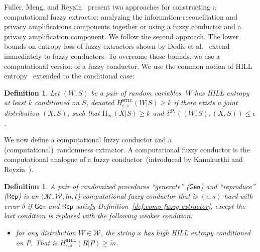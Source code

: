 \documentclass[11pt]{article}
\newcommand{\apref}[1]{\mbox{Appendix~\ref{#1}}}
\newcommand{\defref}[1]{\mbox{Definition~\ref{#1}}}
\newcommand{\class}[1]{{\ensuremath{\mathsf{#1}}}}
\newcommand{\gen}{\ensuremath{\class{Gen}}\xspace}
\newcommand{\rep}{\ensuremath{\class{Rep}}\xspace}
\newcommand{\hill}{\ensuremath{\mathtt{HILL}}\xspace}
\newcommand{\Hav}{\tilde{\mathrm{H}}_\infty}
\newtheorem{definition}[theorem]{Definition}
\begin{document}
Fuller, Meng, and Reyzin~\cite{fuller2013computational} present two approaches for constructing a computational fuzzy extractor: analyzing the information-reconciliation and privacy amplifications components together or using a fuzzy conductor and a privacy amplification component.  We follow the second approach.
The lower bounds on entropy loss of fuzzy extractors shown by Dodis et al.~\cite[Section C]{DBLP:journals/siamcomp/DodisORS08} extend immediately to fuzzy conductors.  %
To overcome these bounds, we use a computational version of a fuzzy conductor.
We use the common notion of HILL entropy~\cite{DBLP:journals/siamcomp/HastadILL99} extended to the conditional case:
\begin{definition}
\label{def:hill ent}
Let $(W, S)$ be a pair of random variables.  $W$ has
\emph{HILL entropy} at least $k$ conditioned on $S$,
denoted $H^{\hill}_{\epsilon, s}(W|S)\geq k$ if there exists a joint distribution $(X, S)$, such that $\Hav(X|S)\geq k$ and $\delta^{\mathcal{D}_{s}} ((W, S),(X,S))\leq \epsilon$.
\end{definition} 
We now define a computational fuzzy conductor and a (computational)~randomness extractor.  A computational fuzzy conductor is the computational analogue of a fuzzy conductor~(introduced by Kanukurthi and Reyzin~\cite{KanukurthiR09}).
\begin{definition}
\label{def:comp fuzzy cond}
A pair of randomized procedures ``generate'' ($\gen$) and ``reproduce'' ($\rep$) is an $(\mathcal{M}, \mathcal{W}, \tilde{m}, t$)-computational fuzzy conductor that is $(\epsilon, s)$-hard with error $\delta$ if $\gen$ and $\rep$ satisfy \defref{def:comp fuzzy extractor}, except the last condition is replaced with the following weaker condition:
\begin{itemize}
\item for any distribution $W\in \mathcal{W}$, the string $x$ has high HILL entropy conditioned on $P$.  That is $H^{\hill}_{\epsilon, s}(R |P)\geq \tilde{m}$.
\end{itemize}
\end{definition}
\end{document}
